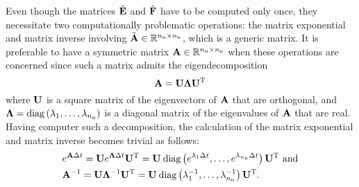 Even though the matrices $\tilde{\mathbf{E}}$ and $\tilde{\mathbf{F}}$ have to be computed only once,
they necessitate two computationally problematic operations: the matrix
exponential and matrix inverse involving $\tilde{\mathbf{A}} \in \mathbb{R}^{{n_\mathrm{n}} \times {n_\mathrm{n}}}$,
which is a generic matrix. It is preferable to have a symmetric matrix $\mathbf{A}
\in \mathbb{R}^{{n_\mathrm{n}} \times {n_\mathrm{n}}}$ when these operations are concerned since such a
matrix admits the eigendecomposition \cite{press2007}
\begin{equation} \elab{eigendecomposition}
  \m{A} = \m{U} \m{\Lambda} \transpose{\m{U}}
\end{equation}
where $\mathbf{U}$ is a square matrix of the eigenvectors of $\mathbf{A}$ that are
orthogonal, and $\mathbf{\Lambda} = \mathrm{diag}\left(\lambda_1, \dots, \lambda_{n_\mathrm{n}}\right)$ is a diagonal
matrix of the eigenvalues of $\mathbf{A}$ that are real. Having computer such a
decomposition, the calculation of the matrix exponential and matrix inverse
becomes trivial as follows:
\begin{align}
  & e^{\m{A} \dt}
  = \m{U} e^{\m{\Lambda} \dt} \transpose{\m{U}}
  = \m{U} \: \diagonal{e^{\lambda_1 \dt}}{e^{\lambda_\nn \dt}} \transpose{\m{U}} \text{ and} \elab{matrix-exponential} \\
  & \m{A}^{-1}
  = \m{U} \m{\Lambda}^{-1} \transpose{\m{U}}
  = \m{U} \: \diagonal{\lambda_1^{-1}}{\lambda_\nn^{-1}} \transpose{\m{U}}. \elab{matrix-inverse}
\end{align}

